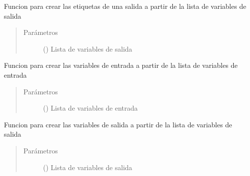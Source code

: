 \documentclass[letterpaper,10pt,spanish]{sphinxmanual}
\begin{document}
\begin{fulllineitems}

\begin{fulllineitems}
\label{\detokenize{codigos/rutinas_fuzzy:rutinas_fuzzy.FuzzyController.crear_etiquetas_output}}
Funcion para crear las etiquetas de una salida a partir de la lista de variables de salida
\begin{quote}\begin{description}
\item[{Parámetros}] \leavevmode
{} () \textendash{} Lista de variables de salida

\end{description}\end{quote}

\end{fulllineitems}


\begin{fulllineitems}
\label{\detokenize{codigos/rutinas_fuzzy:rutinas_fuzzy.FuzzyController.crear_input}}
Funcion para crear las variables de entrada a partir de la lista de variables de entrada
\begin{quote}\begin{description}
\item[{Parámetros}] \leavevmode
{} () \textendash{} Lista de variables de entrada

\end{description}\end{quote}

\end{fulllineitems}


\begin{fulllineitems}
\label{\detokenize{codigos/rutinas_fuzzy:rutinas_fuzzy.FuzzyController.crear_output}}
Funcion para crear las variables de salida a partir de la lista de variables de salida
\begin{quote}\begin{description}
\item[{Parámetros}] \leavevmode
{} () \textendash{} Lista de variables de salida


\end{description}
\end{quote}
\end{fulllineitems}
\end{fulllineitems}
\end{document}
